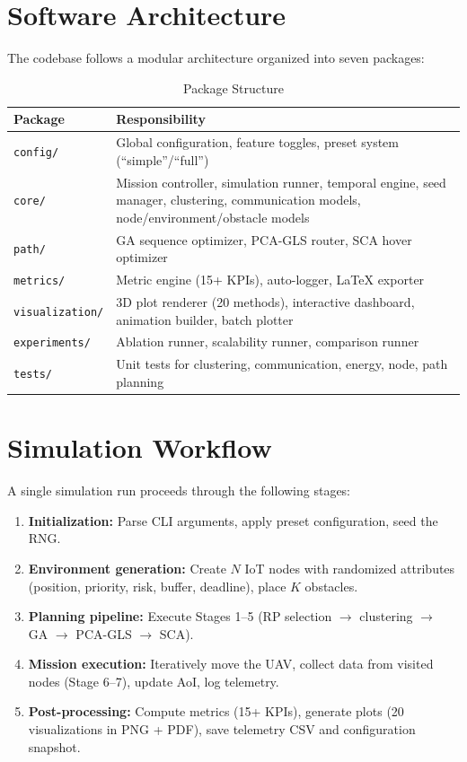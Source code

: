 \documentclass[12pt, a4paper, oneside]{report}
\begin{document}
\section{Software Architecture}

The codebase follows a modular architecture organized into seven packages:

\begin{table}[htbp]
\centering
\caption{Package Structure}
\label{tab:packages}
\begin{tabularx}{\textwidth}{l X}
\toprule
\textbf{Package} & \textbf{Responsibility} \\
\midrule
\texttt{config/} & Global configuration, feature toggles, preset system (``simple''/``full'') \\
\texttt{core/} & Mission controller, simulation runner, temporal engine, seed manager, clustering, communication models, node/environment/obstacle models \\
\texttt{path/} & GA sequence optimizer, PCA-GLS router, SCA hover optimizer \\
\texttt{metrics/} & Metric engine (15+ KPIs), auto-logger, \LaTeX{} exporter \\
\texttt{visualization/} & 3D plot renderer (20 methods), interactive dashboard, animation builder, batch plotter \\
\texttt{experiments/} & Ablation runner, scalability runner, comparison runner \\
\texttt{tests/} & Unit tests for clustering, communication, energy, node, path planning \\
\bottomrule
\end{tabularx}
\end{table}

\section{Simulation Workflow}

A single simulation run proceeds through the following stages:

\begin{enumerate}
    \item \textbf{Initialization:} Parse CLI arguments, apply preset configuration, seed the RNG.
    \item \textbf{Environment generation:} Create $N$ IoT nodes with randomized attributes (position, priority, risk, buffer, deadline), place $K$ obstacles.
    \item \textbf{Planning pipeline:} Execute Stages 1--5 (RP selection $\to$ clustering $\to$ GA $\to$ PCA-GLS $\to$ SCA).
    \item \textbf{Mission execution:} Iteratively move the UAV, collect data from visited nodes (Stage 6--7), update AoI, log telemetry.
    \item \textbf{Post-processing:} Compute metrics (15+ KPIs), generate plots (20 visualizations in PNG + PDF), save telemetry CSV and configuration snapshot.
\end{enumerate}
\end{document}
